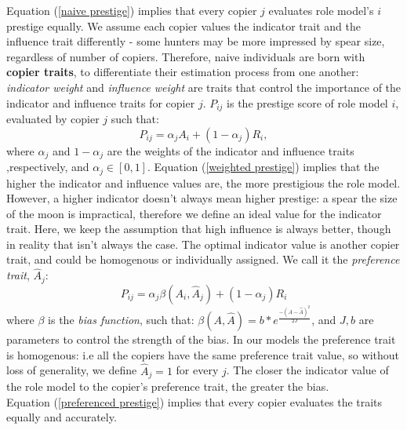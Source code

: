 \documentclass[11pt]{article}
\begin{document}
   Equation (\ref{naive prestige}) implies that every copier $j$ evaluates role model's $i$ prestige equally. %
   We assume each copier values the indicator trait and the influence trait differently - some hunters may be more impressed by spear size, regardless of number of copiers. %
   Therefore, naive individuals are born with \textbf{copier traits}, to differentiate their estimation process from one another: %
   \textit{indicator weight} and \textit{influence weight} are traits that control the importance of the indicator and influence traits for copier $j$.
   $P_{ij}$ is the prestige score of role model $i$, evaluated by copier $j$ such that: %
   \begin{equation}\label{weighted prestige}
   	P_{ij} = \alpha_j A_i + (1-\alpha_j) R_i,
   \end{equation}
   where $\alpha_j$ and  $1-\alpha_j$ are the weights of the indicator and influence traits ,respectively, and $\alpha_j \in [0,1]$.
   Equation (\ref{weighted prestige}) implies that the higher the indicator and influence values are, the more prestigious the role model. %
   However, a higher indicator doesn't always mean higher prestige: a spear the size of the moon is impractical, therefore we define an ideal value for the indicator trait. %
   Here, we keep the assumption that high influence is always better, though in reality that isn't always the case. %
   The optimal indicator value is another copier trait, and could be homogenous or individually assigned. We call it the \textit{preference trait}, $\hat{A}_j$: %
   \begin{equation} \label{preferenced prestige}
   P_{ij} = \alpha_j \beta(A_i,\hat{A}_j) + (1-\alpha_j) R_i
   \end{equation}
   where $\beta$ is the \textit{bias function}, such that: $\beta(A,\hat{A})=b*e^{\frac{-(A - \hat{A})^2}{2J}}$, and $J,b$ are parameters to control the strength of the bias. %
    In our models the preference trait is homogenous: i.e all the copiers have the same preference trait value, so without loss of generality, we define $\hat{A}_j=1$ for every $j$. %
   The closer the indicator value of the role model to the copier's preference trait, the greater the bias.\\
   Equation (\ref{preferenced prestige}) implies that every copier evaluates the traits equally and accurately. %
\end{document}
